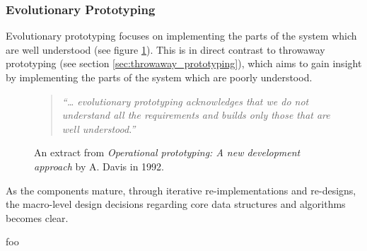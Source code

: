 
\subsubsection{Evolutionary Prototyping}

Evolutionary prototyping focuses on implementing the parts of the system which are well understood (see figure \ref{fig:evolutionary_prototyping}). This is in direct contrast to throwaway prototyping (see section \ref{sec:throwaway_prototyping}), which aims to gain insight by implementing the parts of the system which are poorly understood.

\begin{figure}[htbp]
	\begin{quote}
		\textit{``… evolutionary prototyping acknowledges that we do not understand all the requirements and builds only those that are well understood.''} \cite{operational_prototyping}
	\end{quote}
	\caption{An extract from \textit{Operational prototyping: A new development approach} by A. Davis in 1992.}
	\label{fig:evolutionary_prototyping}
\end{figure}





























As the components mature, through iterative re-implementations and re-designs, the macro-level design decisions regarding core data structures and algorithms becomes clear.






foo
